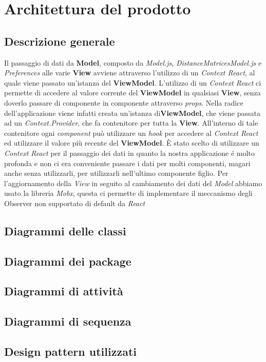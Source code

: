 \section{Architettura del prodotto}
\subsection{Descrizione generale}
Il passaggio di dati da \textbf{Model}, composto da \textit{Model.js}, \textit{DistanceMatricesModel.js} e \textit{Preferences} alle varie \textbf{View} avviene attraverso l'utilizzo di un \textit{Context React}, al quale viene passato un'istanza del \textbf{ViewModel}. L'utilizzo di un \textit{Context React} ci permette di accedere al valore corrente del \textbf{ViewModel} in qualsiasi \textbf{View}, senza doverlo passare di componente in componente attraverso \textit{props}. Nella radice dell'applicazione viene infatti creata un'istanza di\textbf{ViewModel}, che viene passata ad un \textit{Context.Provider}, che fa contenitore per tutta la \textbf{View}. All'interno di tale contenitore ogni \textit{component} può utilizzare un \textit{hook} per accedere al \textit{Context React} ed utilizzare il valore più recente del \textbf{ViewModel}. È stato scelto di utilizzare un \textit{Context React} per il passaggio dei dati in quanto la nostra applicazione é molto profonda e non ci era conveniente passare i dati per molti componenti, magari anche senza utilizzarli, per utilizzarli nell'ultimo componente figlio.
Per l'aggiornamento della \textit{View} in seguito al cambiamento dei dati del \textit{Model} abbiamo usato la libreria \textit{Mobx}, questa ci permette di implementare il meccanismo degli Observer non supportato di default da \textit{React}
\subsection{Diagrammi delle classi}
\subsection{Diagrammi dei package}
\subsection{Diagrammi di attività}
\subsection{Diagrammi di sequenza}
\subsection{Design pattern utilizzati}
